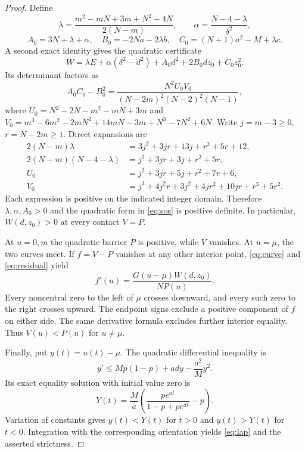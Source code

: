 \documentclass[11pt,a4paper]{article}
\begin{document}
\begin{proof}
Define
\[
\lambda=\frac{m^2-mN+3m+N^2-4N}{2(N-m)},\qquad
\alpha=\frac{N-4-\lambda}{\delta^2},
\]
\[
 A_0=3N+\lambda+\alpha,\quad B_0=-2Na-2\lambda b,\quad C_0=(N+1)a^2-M+\lambda c.
\]
A second exact identity gives the quadratic certificate
\begin{equation}\label{eq:sos}
 W=\lambda E+\alpha(\delta^2-d^2)+A_0d^2+2B_0dz_0+C_0z_0^2.
\end{equation}
Its determinant factors as
\begin{equation}\label{eq:det}
 A_0C_0-B_0^2=\frac{N^2U_0V_0}{(N-2m)^2(N-2)^2(N-1)},
\end{equation}
where $U_0=N^2-2N-m^2-mN+3m$ and
$V_0=m^3-6m^2-2mN^2+14mN-3m+N^3-7N^2+6N$.
Write $j=m-3\ge0$, $r=N-2m\ge1$. Direct expansions are
\begin{align*}
2(N-m)\lambda&=3j^2+3jr+13j+r^2+5r+12,\\
2(N-m)(N-4-\lambda)&=j^2+3jr+3j+r^2+5r,\\
U_0&=j^2+3jr+5j+r^2+7r+6,\\
V_0&=j^3+4j^2r+3j^2+4jr^2+10jr+r^3+5r^2.
\end{align*}
Each expression is positive on the indicated integer domain. Therefore $\lambda,\alpha,A_0>0$ and the quadratic form in \eqref{eq:sos} is positive definite. In particular, $W(d,z_0)>0$ at every contact $V=P$.

At $u=0,m$ the quadratic barrier $P$ is positive, while $V$ vanishes. At $u=\mu$, the two curves meet. If $f=V-P$ vanishes at any other interior point, \eqref{eq:curve} and \eqref{eq:residual} yield
\[
 f'(u)=\frac{G(u-\mu)W(d,z_0)}{NP(u)}.
\]
Every noncentral zero to the left of $\mu$ crosses downward, and every such zero to the right crosses upward. The endpoint signs exclude a positive component of $f$ on either side. The same derivative formula excludes further interior equality. Thus $V(u)<P(u)$ for $u\ne\mu$.

Finally, put $y(t)=u(t)-\mu$. The quadratic differential inequality is
\[
 y'\le Mp(1-p)+ady-\frac{a^2}{M}y^2.
\]
Its exact equality solution with initial value zero is
\[
 Y(t)=\frac M a\left(\frac{pe^{at}}{1-p+pe^{at}}-p\right).
\]
Variation of constants gives $y(t)<Y(t)$ for $t>0$ and $y(t)>Y(t)$ for $t<0$. Integration with the corresponding orientation yields \eqref{eq:lap} and the asserted strictness.
\end{proof}
\end{document}
